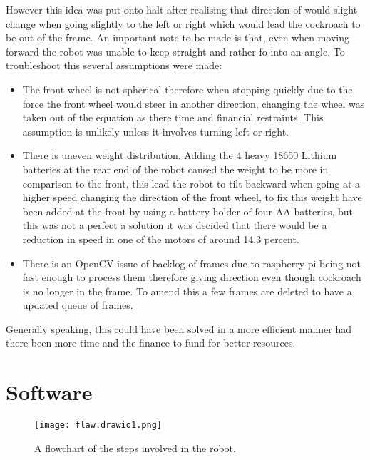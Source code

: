 \documentclass[11pt]{article}
\begin{document}
However this idea was put onto halt after realising that direction of would slight change when going slightly to the left or right which would lead the cockroach to be out of the frame. An important note to be made is that, even when moving forward the robot was unable to keep straight and rather fo into an angle. To troubleshoot this several assumptions were made:
\begin{itemize}
	\item The front wheel is not spherical therefore  when stopping quickly due to the force the front wheel would steer in another direction, changing the wheel was taken out of the equation as there time and financial restraints. This assumption is unlikely unless it involves turning left or right. 
	\item There is uneven weight distribution. Adding the 4 heavy 18650 Lithium batteries at the rear end of the robot caused the weight to be more in comparison to the front, this lead the robot to tilt backward when going at a higher speed changing the direction of the front wheel, to fix this weight have been added at the front by using a battery holder of four AA batteries, but this was not a perfect a solution it was decided that there would be a reduction in speed in one of the motors of around 14.3 percent.
	\item	There is an OpenCV issue of  backlog of frames due to raspberry pi being not fast enough to process them therefore giving direction even though cockroach is no longer in the frame. To amend this a few frames are deleted to have a updated queue of frames.
\end{itemize}


Generally speaking, this could have been solved in a more efficient manner had there been more time and the finance to fund for better resources.


	
	\section{Software}
	
	
	\begin{center}
		
		
		\begin{figure}[H]
			\centering
			\texttt{[image: flaw.drawio1.png]}
			\caption{A flowchart of the steps involved in the robot. }
			\label{fig:Flowchart}
		\end{figure}
	\end{center}
	
\end{document}
